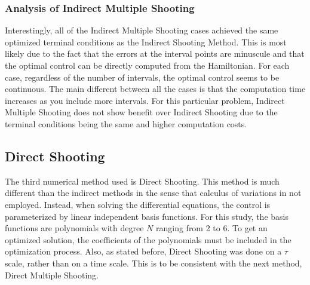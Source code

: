 \documentclass[]{article}
\begin{document}
\subsubsection{Analysis of Indirect Multiple Shooting}
Interestingly, all of the Indirect Multiple Shooting cases achieved the same optimized terminal conditions as the Indirect Shooting Method. This is most likely due to the fact that the errors at the interval points are minuscule and that the optimal control can be directly computed from the Hamiltonian. For each case, regardless of the number of intervals, the optimal control seems to be continuous. The main different between all the cases is that the computation time increases as you include more intervals. For this particular problem, Indirect Multiple Shooting does not show benefit over Indirect Shooting due to the terminal conditions being the same and higher computation costs.
\subsection{Direct Shooting}
The third numerical method used is Direct Shooting. This method is much different than the indirect methods in the sense that calculus of variations in not employed. Instead, when solving the differential equations, the control is parameterized by linear independent basis functions. For this study, the basis functions are polynomials with degree \(N\) ranging from 2 to 6. To get an optimized solution, the coefficients of the polynomials must be included in the optimization process. Also, as stated before, Direct Shooting was done on a \(\tau\) scale, rather than on a time scale. This is to be consistent with the next method, Direct Multiple Shooting.
 
\end{document}
